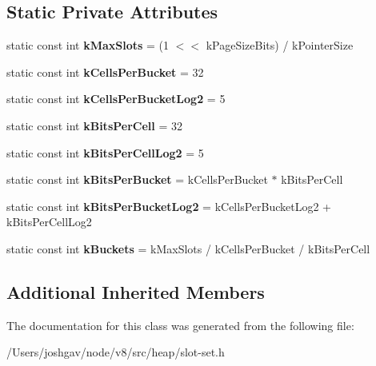 \subsection*{Static Private Attributes}
\begin{DoxyCompactItemize}
\item 
static const int {\bfseries k\+Max\+Slots} = (1 $<$$<$ k\+Page\+Size\+Bits) / k\+Pointer\+Size\hypertarget{classv8_1_1internal_1_1_slot_set_aa8bc923ac91b038986a58ac77d6f0e32}{}\label{classv8_1_1internal_1_1_slot_set_aa8bc923ac91b038986a58ac77d6f0e32}

\item 
static const int {\bfseries k\+Cells\+Per\+Bucket} = 32\hypertarget{classv8_1_1internal_1_1_slot_set_a296e3fcbe10ba1f0831a958904a200e6}{}\label{classv8_1_1internal_1_1_slot_set_a296e3fcbe10ba1f0831a958904a200e6}

\item 
static const int {\bfseries k\+Cells\+Per\+Bucket\+Log2} = 5\hypertarget{classv8_1_1internal_1_1_slot_set_acbf962b07ca7beec299f6fd613b0c9ae}{}\label{classv8_1_1internal_1_1_slot_set_acbf962b07ca7beec299f6fd613b0c9ae}

\item 
static const int {\bfseries k\+Bits\+Per\+Cell} = 32\hypertarget{classv8_1_1internal_1_1_slot_set_a3724ab3181ed9e1381cea02f045ca8d3}{}\label{classv8_1_1internal_1_1_slot_set_a3724ab3181ed9e1381cea02f045ca8d3}

\item 
static const int {\bfseries k\+Bits\+Per\+Cell\+Log2} = 5\hypertarget{classv8_1_1internal_1_1_slot_set_a70e96ee8537edccafc96fc89d25ec398}{}\label{classv8_1_1internal_1_1_slot_set_a70e96ee8537edccafc96fc89d25ec398}

\item 
static const int {\bfseries k\+Bits\+Per\+Bucket} = k\+Cells\+Per\+Bucket $\ast$ k\+Bits\+Per\+Cell\hypertarget{classv8_1_1internal_1_1_slot_set_ace4ee1ce87e59169b2c766a1f7a61c8f}{}\label{classv8_1_1internal_1_1_slot_set_ace4ee1ce87e59169b2c766a1f7a61c8f}

\item 
static const int {\bfseries k\+Bits\+Per\+Bucket\+Log2} = k\+Cells\+Per\+Bucket\+Log2 + k\+Bits\+Per\+Cell\+Log2\hypertarget{classv8_1_1internal_1_1_slot_set_ac9ff1fb40d803d77e96deaddafda8e7d}{}\label{classv8_1_1internal_1_1_slot_set_ac9ff1fb40d803d77e96deaddafda8e7d}

\item 
static const int {\bfseries k\+Buckets} = k\+Max\+Slots / k\+Cells\+Per\+Bucket / k\+Bits\+Per\+Cell\hypertarget{classv8_1_1internal_1_1_slot_set_ac9128d204d2baf797171f4a6ded2daa7}{}\label{classv8_1_1internal_1_1_slot_set_ac9128d204d2baf797171f4a6ded2daa7}

\end{DoxyCompactItemize}
\subsection*{Additional Inherited Members}


The documentation for this class was generated from the following file\+:\begin{DoxyCompactItemize}
\item 
/\+Users/joshgav/node/v8/src/heap/slot-\/set.\+h\end{DoxyCompactItemize}
